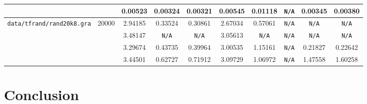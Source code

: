 \documentclass[12pt,a4paper,twoside]{article}
\begin{document}
{\begin{tabular}{ | l | c | c | c | c | c | c | c | c | c | }
\verb| | &  & 0.00523 & 0.00324 & 0.00321 & 0.00545 & 0.01118 & \verb|N/A| & 0.00345 & 0.00380 \\
\hline
\verb|data/tfrand/rand20k8.gra| & 20000 & 2.94185 & 0.33524 & 0.30861 & 2.67034 & 0.57061 & \verb|N/A| & \verb|N/A| & \verb|N/A| \\
\verb| | &  & 3.48147 & \verb|N/A| & \verb|N/A| & 3.05613 & \verb|N/A| & \verb|N/A| & \verb|N/A| & \verb|N/A| \\
\verb| | &  & 3.29674 & 0.43735 & 0.39964 & 3.00535 & 1.15161 & \verb|N/A| & 0.21827 & 0.22642 \\
\verb| | &  & 3.44501 & 0.62727 & 0.71912 & 3.09729 & 1.06972 & \verb|N/A| & 1.47558 & 1.60258 \\
\hline
  \end{tabular}



}

\section{Conclusion}
\end{document}
